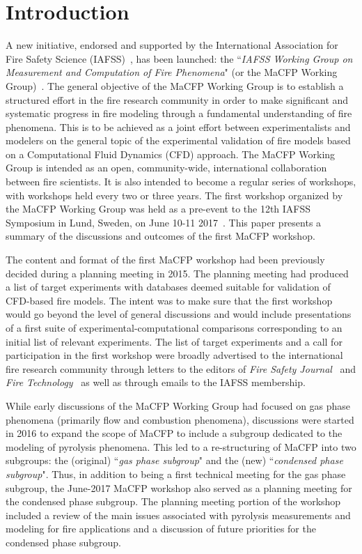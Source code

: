 
\section{Introduction} \label{sec:intro}

A new initiative, endorsed and supported by the International Association for Fire Safety Science (IAFSS)~\cite{IAFSS_website}, has been launched: the ``{\it IAFSS Working Group on Measurement and Computation of Fire Phenomena}" (or the MaCFP Working Group)~\cite{MaCFP_website}. The general objective of the MaCFP Working Group is to establish a structured effort in the fire research community in order to make significant and systematic progress in fire modeling through a fundamental understanding of fire phenomena. This is to be achieved as a joint effort between experimentalists and modelers on the general topic of the experimental validation of fire models based on a Computational Fluid Dynamics (CFD) approach. The MaCFP Working Group is intended as an open, community-wide, international collaboration between fire scientists. It is also intended to become a regular series of workshops, with workshops held every two or three years. The first workshop organized by the MaCFP Working Group was held as a pre-event to the 12th IAFSS Symposium in Lund, Sweden, on June 10-11 2017~\cite{MaCFP_wks_presentations}. This paper presents a summary of the discussions and outcomes of the first MaCFP workshop.

The content and format of the first MaCFP workshop had been previously decided during a planning meeting in 2015. The planning meeting had produced a list of target experiments with databases deemed suitable for validation of CFD-based fire models. The intent was to make sure that the first workshop would go beyond the level of general discussions and would include presentations of a first suite of experimental-computational comparisons corresponding to an initial list of relevant experiments. The list of target experiments and a call for participation in the first workshop were broadly advertised to the international fire research community through letters to the editors of {\it Fire Safety Journal}~\cite{MaCFP_FSJ} and {\it Fire Technology}~\cite{MaCFP_FT} as well as through emails to the IAFSS membership.

While early discussions of the MaCFP Working Group had focused on gas phase phenomena (primarily flow and combustion phenomena), discussions were started in 2016 to expand the scope of MaCFP to include a subgroup dedicated to the modeling of pyrolysis phenomena. This led to a re-structuring of MaCFP into two subgroups: the (original) ``{\it gas phase subgroup}" and the (new) ``{\it condensed phase subgroup}". Thus, in addition to being a first technical meeting for the gas phase subgroup, the June-2017 MaCFP workshop also served as a planning meeting for the condensed phase subgroup. The planning meeting portion of the workshop included a review of the main issues associated with pyrolysis measurements and modeling for fire applications and a discussion of future priorities for the condensed phase subgroup.

